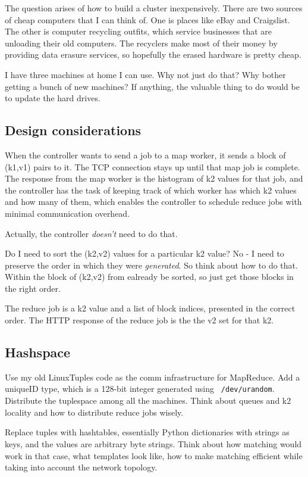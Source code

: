 \documentclass[11pt]{article}
\begin{document}
The question arises of how to build a cluster inexpensively. There are
two sources of cheap computers that I can think of. One is places like
eBay and Craigslist. The other is computer recycling outfits, which
service businesses that are unloading their old computers. The
recyclers make most of their money by providing data erasure services,
so hopefully the erased hardware is pretty cheap.

I have three machines at home I can use. Why not just do that? Why
bother getting a bunch of new machines? If anything, the valuable
thing to do would be to update the hard drives.

\subsection{Design considerations}

When the controller wants to send a job to a map worker, it sends a
block of (k1,v1) pairs to it. The TCP connection stays up until that
map job is complete. The response from the map worker is the histogram
of k2 values for that job, and the controller has the task of keeping
track of which worker has which k2 values and how many of them, which
enables the controller to schedule reduce jobs with minimal
communication overhead.

Actually, the controller {\em doesn't} need to do that.

Do I need to sort the (k2,v2) values for a particular k2 value? No - I
need to preserve the order in which they were {\em generated}. So think
about how to do that. Within the block of (k2,v2) from ealready be
sorted, so just get those blocks in the right order.

The reduce job is a k2 value and a list of block indices, presented in
the correct order. The HTTP response of the reduce job is the the v2
set for that k2.

\subsection{Hashspace}

Use my old LinuxTuples code as the comm infrastructure for MapReduce.
Add a uniqueID type, which is a 128-bit integer generated using {\tt
  /dev/urandom}. Distribute the tuplespace among all the machines.
Think about queues and k2 locality and how to distribute reduce jobs
wisely.

Replace tuples with hashtables, essentially Python dictionaries with
strings as keys, and the values are arbitrary byte strings. Think
about how matching would work in that case, what templates look like,
how to make matching efficient while taking into account the network
topology.
\end{document}
